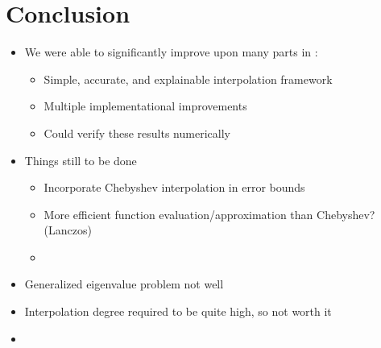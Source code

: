 \chapter{Conclusion}
\label{chp:6-conclusion}

\begin{itemize}
    \item We were able to significantly improve upon many parts in \cite{lin2017randomized}:
    \begin{itemize}
        \item Simple, accurate, and explainable interpolation framework
        \item Multiple implementational improvements
        \item Could verify these results numerically
    \end{itemize}
    \item Things still to be done
    \begin{itemize}
        \item Incorporate Chebyshev interpolation in error bounds
        \item More efficient function evaluation/approximation than Chebyshev? (Lanczos)
        \item 
    \end{itemize}
    \item Generalized eigenvalue problem not well
    \item Interpolation degree required to be quite high, so not worth it
    \item 
\end{itemize}